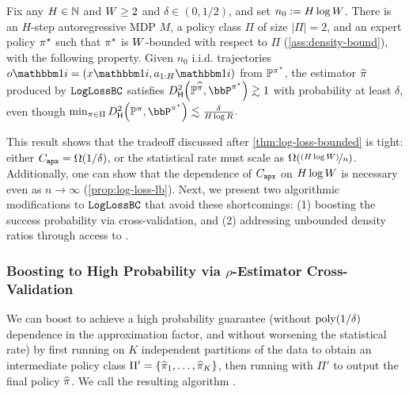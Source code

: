 \begin{proposition}\label{prop:log-loss-prob-lb}
  Fix any $H \in \NN$ and $\denbound \geq 2$ and $\delta \in (0,1/2)$, and set $n_0 := H\log{}\denbound$. There is an $H$-step autoregressive MDP $M$, a policy class $\Pi$ of size $|\Pi| = 2$, and an expert policy $\pistar$ such that $\pistar$ is $\denbound$-bounded with respect to $\Pi$ (\cref{ass:density-bound}), with the following property. Given $n_0$ i.i.d. trajectories $o\ind{i} = (x\ind{i},a_{1:H}\ind{i})$ from $\BP^{\pistar}$, the estimator $\pihat$ produced by $\loglossbc$ satisfies $\Dhels{\BP^{\pihat}}{\bbP^{\pistar}} \gtrsim 1$ with probability at least $\delta$, even though $\min_{\pi\in\Pi} \Dhels{\BP^\pi}{\bbP^{\pistar}} \lesssim \frac{\delta}{H\log R}.$
  \end{proposition}

This result shows that the tradeoff discussed after \cref{thm:log-loss-bounded} is tight: either $\Capx = \Omega(1/\delta)$, or the statistical rate must scale as $\Omega(\nicefrac{(H\log{} \denbound)}{n})$. Additionally, one can show that  the dependence of $\Capx$ on $H\log{}\denbound$ is necessary even as $n \to \infty$ (\cref{prop:log-loss-lb}). Next, we present two algorithmic modifications to $\loglossbc$ that avoid these shortcomings: (1) boosting the success probability via cross-validation, and (2) addressing unbounded density ratios through access to \emph{\densobs}.\loose
  
  \subsubsection{Boosting to High Probability via $\rho$-Estimator Cross-Validation}
We can boost \loglossbc to achieve a high probability guarantee 
  (without $\poly(1/\delta)$ dependence in the approximation factor, and without worsening the statistical rate)
  by first running \loglossbc on $K$ independent partitions of the data 
  to obtain an intermediate policy class $\Pi' = \crl*{\pihat_{1},\ldots,\pihat_K}$,
  then running \rhobc with $\Pi'$ to output the final policy $\pihat$.
  We call the resulting algorithm \boostedloglossbc.
  
%

